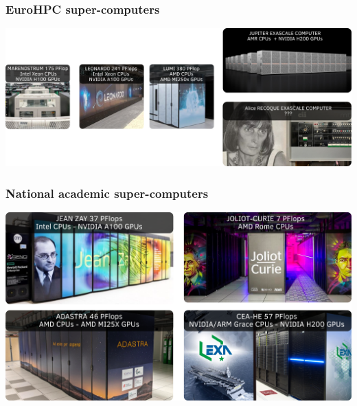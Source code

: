 \documentclass[aspectratio=169]{beamer}
\begin{document}
\begin{frame}
\frametitle{EuroHPC super-computers}

\begin{center}
    \includegraphics[width=1\textwidth]{../../images/euroHPC.png}
\end{center}

\end{frame}


\begin{frame}
\frametitle{National academic super-computers}

\begin{center}
    \includegraphics[width=1\textwidth]{../../images/french_super_computers.png}
\end{center}

\end{frame}

\end{document}
